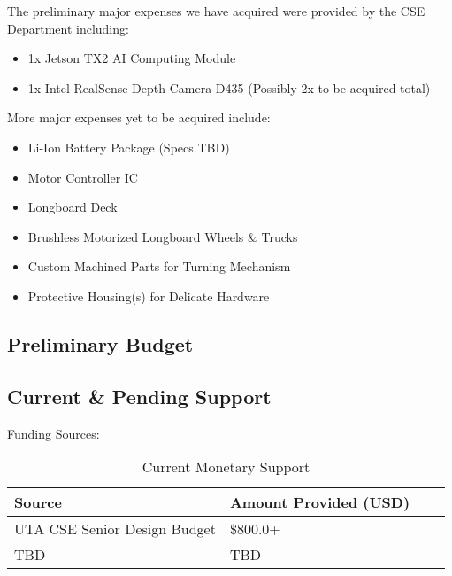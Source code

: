 The preliminary major expenses we have acquired were provided by the CSE Department including:

\begin{itemize}
    \item 1x Jetson TX2 AI Computing Module
    \item 1x Intel RealSense Depth Camera D435 (Possibly 2x to be acquired total)
\end{itemize}
More major expenses yet to be acquired include:

\begin{itemize}
    \item Li-Ion Battery Package (Specs TBD)
    \item Motor Controller IC
    \item Longboard Deck
    \item Brushless Motorized Longboard Wheels \& Trucks
    \item Custom Machined Parts for Turning Mechanism
    \item Protective Housing(s) for Delicate Hardware
\end{itemize}

\subsection{Preliminary Budget}
\begin{table}[h]
\caption{High Level Preliminary Budget} 
\end{table}

\subsection{Current \& Pending Support}
Funding Sources:
\begin{table}[h]
\centering
\begin{tabular}{|l|l|l|l|}
\hline
 \textbf{Source} & \textbf{Amount Provided (USD)} \\ \hline
 UTA CSE Senior Design Budget & \$800.0+ \\ \hline
 TBD & TBD \\ \hline
\end{tabular}
\caption{Current Monetary Support}
\end{table}